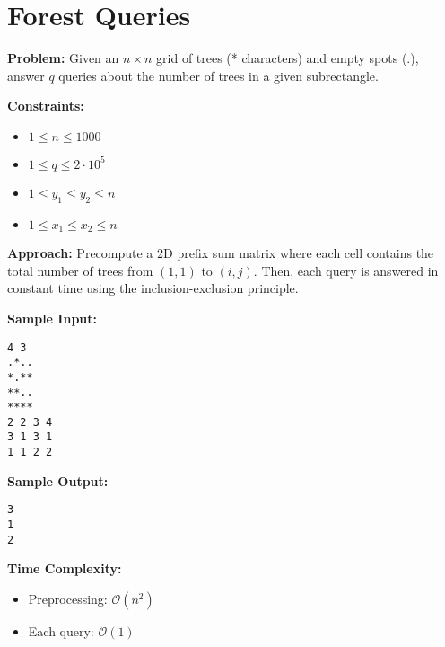 
\section{Forest Queries}

\textbf{Problem:} Given an $n \times n$ grid of trees (* characters) and empty spots (.), answer $q$ queries about the number of trees in a given subrectangle.

\textbf{Constraints:}
\begin{itemize}
    \item $1 \leq n \leq 1000$
    \item $1 \leq q \leq 2 \cdot 10^5$
    \item $1 \leq y_1 \leq y_2 \leq n$
    \item $1 \leq x_1 \leq x_2 \leq n$
\end{itemize}

\textbf{Approach:} Precompute a 2D prefix sum matrix where each cell contains the total number of trees from $(1,1)$ to $(i,j)$. Then, each query is answered in constant time using the inclusion-exclusion principle.

\textbf{Sample Input:}
\begin{verbatim}
4 3
.*..
*.**
**..
****
2 2 3 4
3 1 3 1
1 1 2 2
\end{verbatim}

\textbf{Sample Output:}
\begin{verbatim}
3
1
2
\end{verbatim}

\textbf{Time Complexity:}
\begin{itemize}
    \item Preprocessing: $\mathcal{O}(n^2)$
    \item Each query: $\mathcal{O}(1)$
\end{itemize}
